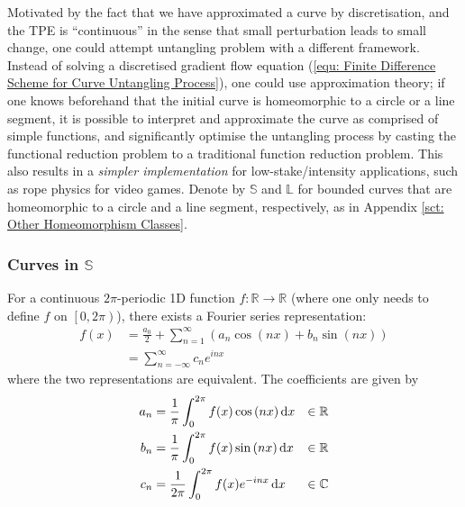 \documentclass[../dissertation.tex]{subfiles}
\begin{document}
Motivated by the fact that we have approximated a curve by discretisation,
and the TPE is ``continuous'' in the sense that small perturbation
leads to small change,
one could attempt untangling problem with a different framework.
Instead of solving a discretised gradient flow equation (\ref{equ: Finite Difference Scheme for Curve Untangling Process}),
one could use approximation theory;
if one knows beforehand that the initial curve is homeomorphic to a circle or a line segment,
it is possible to interpret and approximate the curve as comprised of simple functions,
and significantly optimise the untangling process by casting the functional reduction problem to
a traditional function reduction problem.
This also results in a \textit{simpler implementation} for low-stake/intensity applications,
such as rope physics for video games.
Denote by $\mathbb{S}$ and $\mathbb{L}$ for bounded curves that are homeomorphic to a circle and a line segment, respectively, as in Appendix \ref{sct: Other Homeomorphism Classes}.

\subsubsection{Curves in $\mathbb{S}$}
For a continuous $2\pi$-periodic 1D function $f:\mathbb{R} \rightarrow \mathbb{R}$
(where one only needs to define $f$ on $\left[ 0,2\pi \right)$),
there exists a Fourier series representation:
\begin{align}
    f(x) &= \frac{a_0}{2} + \sum_{n=1}^{\infty} \left( a_n \cos {(nx)} + b_n \sin {(nx)} \right) \\
    &= \sum_{n=-\infty}^{\infty} c_n e^{inx}
\end{align}
where the two representations are equivalent.
The coefficients are given by
\begin{align}
    a_n &= \frac{1}{\pi} \int_{0}^{2\pi} f(x) \cos {\left( nx \right)} \, \text{d} x &\in \mathbb{R}\\
    b_n &= \frac{1}{\pi} \int_{0}^{2\pi} f(x) \sin {\left( nx \right)} \, \text{d} x &\in \mathbb{R} \\
    c_n &= \frac{1}{2 \pi} \int_{0}^{2\pi} f(x) e^{-inx} \, \text{d} x &\in \mathbb{C}
\end{align}
\end{document}
